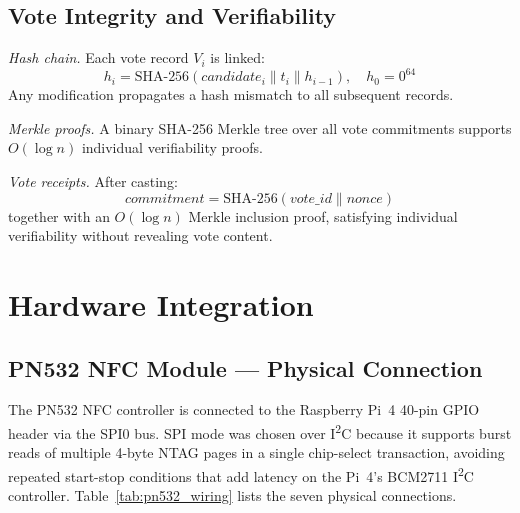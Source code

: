 \documentclass[conference]{IEEEtran}
\begin{document}
\subsection{Vote Integrity and Verifiability}
\label{sec:vote_integrity}

\textit{Hash chain.} Each vote record \(V_i\) is linked:
\begin{equation}
  h_i = \mathrm{SHA\text{-}256}(\mathit{candidate}_i \| t_i \| h_{i-1}),
  \quad h_0 = 0^{64}
\end{equation}
Any modification propagates a hash mismatch to all subsequent records.

\textit{Merkle proofs.} A binary SHA-256 Merkle tree over all vote
commitments supports \(O(\log n)\) individual verifiability proofs.

\textit{Vote receipts.} After casting:
\begin{equation}
  \mathit{commitment} = \mathrm{SHA\text{-}256}(\mathit{vote\_id} \| \mathit{nonce})
\end{equation}
together with an \(O(\log n)\) Merkle inclusion proof, satisfying
individual verifiability without revealing vote content.

\section{Hardware Integration}
\label{sec:hardware}

\subsection{PN532 NFC Module — Physical Connection}

The PN532 NFC controller is connected to the Raspberry Pi~4 40-pin GPIO
header via the SPI0 bus. SPI mode was chosen over I\textsuperscript{2}C
because it supports burst reads of multiple 4-byte NTAG pages in a single
chip-select transaction, avoiding repeated start-stop conditions that add
latency on the Pi~4's BCM2711 I\textsuperscript{2}C controller.
Table~\ref{tab:pn532_wiring} lists the seven physical connections.
\end{document}
